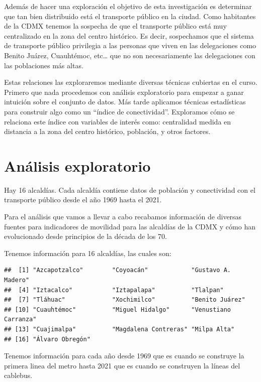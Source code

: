 \documentclass[
  spanish,
]{article}
\begin{document}
Además de hacer una exploración el objetivo de esta investigación es
determinar que tan bien distribuido está el transporte público en la
ciudad. Como habitantes de la CDMX tenemos la sospecha de que el
transporte público está muy centralizado en la zona del centro
histórico. Es decir, sospechamos que el sistema de transporte público
privilegia a las personas que viven en las delegaciones como Benito
Juárez, Cuauhtémoc, etc\ldots{} que no son necesariamente las
delegaciones con las poblaciones más altas.

Estas relaciones las exploraremos mediante diversas técnicas cubiertas
en el curso. Primero que nada procedemos con análisis exploratorio para
empezar a ganar intuición sobre el conjunto de datos. Más tarde
aplicamos técnicas estadísticas para construir algo como un ``índice de
conectividad''. Exploramos cómo se relaciona este índice con variables
de interés como: centralidad medida en distancia a la zona del centro
histórico, población, y otros factores.

\hypertarget{anuxe1lisis-exploratorio}{%
\section{Análisis exploratorio}\label{anuxe1lisis-exploratorio}}

Hay 16 alcaldías. Cada alcaldía contiene datos de población y
conectividad con el transporte público desde el año 1969 hasta el 2021.

Para el análisis que vamos a llevar a cabo recabamos información de
diversas fuentes para indicadores de movilidad para las alcaldías de la
CDMX y cómo han evolucionado desde principios de la década de los 70.

Tenemos información para 16 alcaldías, las cuales son:

\begin{verbatim}
##  [1] "Azcapotzalco"        "Coyoacán"            "Gustavo A. Madero"  
##  [4] "Iztacalco"           "Iztapalapa"          "Tlalpan"            
##  [7] "Tláhuac"             "Xochimilco"          "Benito Juárez"      
## [10] "Cuauhtémoc"          "Miguel Hidalgo"      "Venustiano Carranza"
## [13] "Cuajimalpa"          "Magdalena Contreras" "Milpa Alta"         
## [16] "Álvaro Obregón"
\end{verbatim}

Tenemos información para cada año desde 1969 que es cuando se construye
la primera linea del metro hasta 2021 que es cuando se construyen la
líneas del cablebus.
\end{document}

